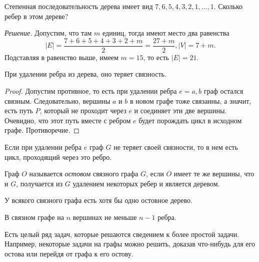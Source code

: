 \begin{example}
	Степенная последовательность дерева имеет вид $7, 6, 5, 4, 3, 2, 1, \dots, 1$. Сколько ребер в этом дереве?

	\emph{Решение.} Допустим, что там $m$ единиц, тогда имеют место два равенства
	$$|E| = \frac{7 + 6 + 5 + 4 + 3 + 2 + m}{2} = \frac{27 + m}{2}, |V| = 7 + m.$$
	Подставляя в равенство выше, имеем $m = 15$, то есть $|E| = 21$.
\end{example}	

\begin{statement}
	При удалении ребра из дерева, оно теряет связность.	
\begin{proof}
	Допустим противное, то есть при удалении ребра $e = {a, b}$ граф остался связным. Следовательно, вершины $a$ и $b$ в новом графе тоже связанны, а значит, есть путь $P$, который не проходит через $e$ и соединяет эти две вершины. Очевидно, что этот путь вместе с ребром $e$ будет порождать цикл в исходном графе. Противоречие.
\end{proof}
\end{statement}

\begin{consequence}
	Если при удалении ребра $e$ граф $G$ не теряет своей связности, то в нем есть цикл, проходящий через это ребро.
\end{consequence}

\begin{definition}
	Граф $O$ называется \emph{остовом} связного графа $G$, если $O$ имеет те же вершины, что и $G$, получается из $G$ удалением некоторых ребер и является деревом.
\end{definition}

\begin{statement}
	У всякого связного графа есть хотя бы одно остовное дерево.
\end{statement}

\begin{consequence}
	В связном графе на $n$ вершинах не меньше $n-1$ ребра.
\end{consequence}
	Есть целый ряд задач, которые решаются сведением к более простой задачи. Например, некоторые задачи на графы можно решить, доказав что-нибудь для его остова или перейдя от графа к его остову.
	
